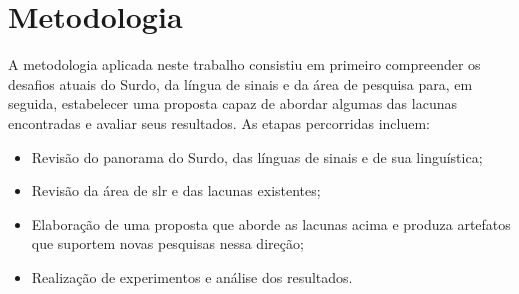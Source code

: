 \section{Metodologia}
\label{sec:introducao-metodologia}

A metodologia aplicada neste trabalho consistiu em primeiro compreender os desafios atuais do Surdo, da língua de sinais e da área de pesquisa para, em seguida, estabelecer uma proposta capaz de abordar algumas das lacunas encontradas e avaliar seus resultados.
As etapas percorridas incluem:


\begin{itemize}
    \item Revisão do panorama do Surdo, das línguas de sinais e de sua linguística;
    \item Revisão da área de \acrlong{slr} e das lacunas existentes;
    \item Elaboração de uma proposta que aborde as lacunas acima e produza artefatos que suportem novas pesquisas nessa direção;
    \item Realização de experimentos e análise dos resultados.
\end{itemize}


